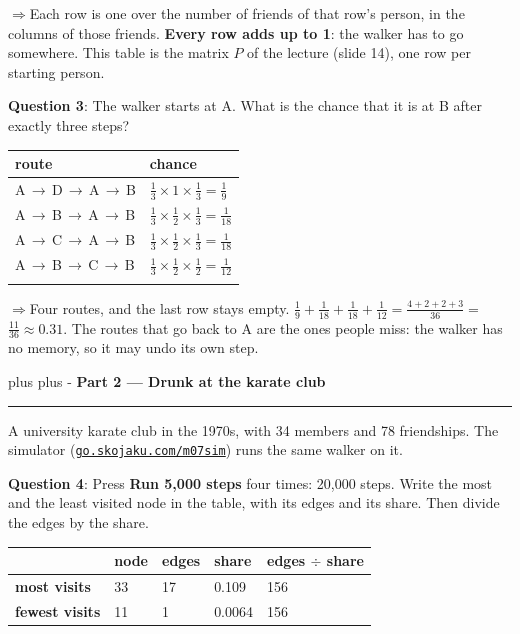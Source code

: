 \documentclass[a4paper, 14pt]{extarticle}
\newcommand{\needroom}[1]{%
  \par
  \begingroup
    \setlength{\dimen0}{#1}%
    \vskip 0pt plus \dimen0
    \penalty -100%
    \vskip 0pt plus -\dimen0
  \endgroup}
\newcommand{\parthead}[2]{%
  \needroom{6\baselineskip}%
  \partheadhere{#1}{#2}}
\newcommand{\partheadhere}[2]{%
  \vspace{0.5em}
  {\large\bfseries Part #1 --- #2}\par
  \vspace{-0.4em}\rule{\textwidth}{0.8pt}\par
  \vspace{0.1em}}
\newcommand{\simlink}{https://go.skojaku.com/m07sim}
\newcommand{\simurl}{\href{\simlink}{\texttt{go.skojaku.com/m07sim}}}
\newcommand{\ans}[1]{\textbf{\textcolor{pltblue!75!black}{#1}}}
\newcommand{\arrow}{\textcolor{pltblue!75!black}{$\Rightarrow$}\;}
\newcommand{\mans}[1]{{\color{pltblue!75!black}#1}}
\begin{document}
\arrow Each row is one over the number of friends of that row's person, in
the columns of those friends. \ans{Every row adds up to 1}: the walker has to
go somewhere. This table is the matrix $P$ of the lecture (slide 14), one row
per starting person.

{\bf Question 3}: The walker starts at A. What is the chance that it is at B
after exactly three steps?

\begin{center}
{\setlength{\tabcolsep}{8pt}
\begin{tabular}{|C{5.0cm}|C{5.0cm}|}
\hline
\bfseries route & \bfseries chance \\ \hline
A\,$\to$\,D\,$\to$\,A\,$\to$\,B & $\frac13 \times 1 \times \frac13 = \frac19$ \\[0.08cm] \hline
\mans{A\,$\to$\,B\,$\to$\,A\,$\to$\,B} & \mans{$\frac13 \times \frac12 \times \frac13 = \frac1{18}$} \\[0.08cm] \hline
\mans{A\,$\to$\,C\,$\to$\,A\,$\to$\,B} & \mans{$\frac13 \times \frac12 \times \frac13 = \frac1{18}$} \\[0.08cm] \hline
\mans{A\,$\to$\,B\,$\to$\,C\,$\to$\,B} & \mans{$\frac13 \times \frac12 \times \frac12 = \frac1{12}$} \\[0.08cm] \hline
& \\[0.3cm] \hline
\end{tabular}}
\end{center}

\arrow Four routes, and the last row stays empty.
$\frac19 + \frac1{18} + \frac1{18} + \frac1{12} = \frac{4+2+2+3}{36} =$
\ans{$\frac{11}{36} \approx 0.31$}. The routes that go back to A are the ones
people miss: the walker has no memory, so it may undo its own step.

\parthead{2}{Drunk at the karate club}

A university karate club in the 1970s, with 34 members and 78 friendships. The
simulator (\simurl) runs the same walker on it.

{\bf Question 4}: Press \textbf{Run 5,000 steps} four times: 20,000 steps.
Write the most and the least visited node in the table, with its edges and its
share. Then divide the edges by the share.

\begin{center}
{\setlength{\tabcolsep}{6pt}
\begin{tabular}{|C{3.2cm}|C{1.7cm}|C{1.7cm}|C{2.0cm}|C{2.6cm}|}
\hline
& \bfseries node & \bfseries edges & \bfseries share & \bfseries edges $\div$ share \\ \hline
\bfseries most visits & \mans{33} & \mans{17} & \mans{0.109} & \mans{156} \\[0.08cm] \hline
\bfseries fewest visits & \mans{11} & \mans{1} & \mans{0.0064} & \mans{156} \\[0.08cm] \hline
\end{tabular}}
\end{center}
\end{document}

